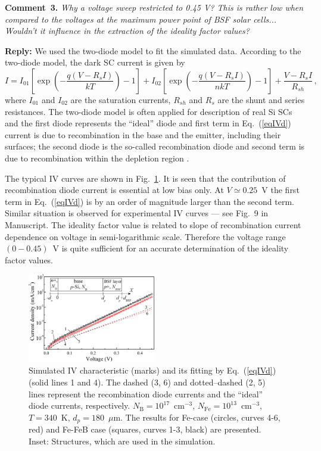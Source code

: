 \documentclass[num-refs]{wiley-article} %
\begin{document}
\vspace{1cm}
\noindent
\textcolor[rgb]{0.00,0.50,1.00}{\textbf{Comment~3.}}
\emph{Why a voltage sweep restricted to 0.45 V?
This is rather low when compared to the voltages at the maximum power point of BSF solar cells...
Wouldn't it influence in the extraction of the ideality factor values?}

\vspace{0.5cm}
\noindent
\textcolor[rgb]{0.51,0.00,0.00}{\textbf{Reply:}}
We used the two-diode model to fit the simulated data.
According to the two-diode model, the dark SC current is given by
\begin{equation}
\label{eqIVd}
    I=I_{01}\left[\exp\left(-\frac{q(V-R_sI)}{kT}\right)-1\right]
      + I_{02}\left[\exp\left(-\frac{q(V-R_sI)}{nkT}\right)-1\right]
      +\frac{V-R_sI}{R_{sh}}\,,
\end{equation}
where
$I_{01}$ and $I_{02}$ are the saturation currents,
$R_{sh}$ and $R_s$ are the shunt and series resistances.
The two-diode model is often applied for description of real Si SCs
and the first diode represents the ``ideal'' diode and
first term in Eq.~(\ref{eqIVd})
current is due to recombination in the base
and the emitter, including their surfaces;
the second diode is the so-called recombination diode
and second term is due to recombination within
the depletion region \citep{Breitenstein2013}.

The typical IV curves are shown in Fig.~\ref{fig_IV}.
It is seen that the contribution of recombination diode current is essential at low bias only.
At $V\simeq 0.25$~V the first term in Eq.~(\ref{eqIVd}) is
by an order of magnitude larger than the second term.
Similar situation is observed for
experimental IV curves --- see Fig.~9 in Manuscript.
The ideality factor value is related to slope of recombination current
dependence on voltage in semi-logarithmic scale.
Therefore the voltage range $(0-0.45)$~V is quite sufficient for an accurate determination of the ideality factor values.

\begin{figure}[t]
\centering
\includegraphics[width=0.5\textwidth]{FigIV}
\caption{Simulated IV characteristic (marks)
and its fitting by Eq.~(\ref{eqIVd}) (solid lines 1 and 4).
The dashed (3, 6) and dotted--dashed (2, 5)
lines represent the recombination diode currents and the ``ideal'' diode currents, respectively.
$N_\mathrm{B} = 10^{17}$~cm$^{-3}$, $N_\mathrm{Fe} = 10^{13}$~cm$^{-3}$,
$T = 340$~K, $d_p = 180$~$\mu$m.
The results for Fe-case (circles, curves 4-6, red)
and Fe-FeB case (squares, curves 1-3, black) are presented.
Inset: Structures, which are used in the simulation.
}
\label{fig_IV}
\end{figure}
\end{document}
